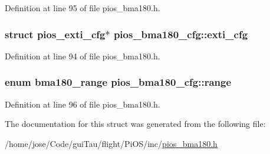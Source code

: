 Definition at line 95 of file pios\-\_\-bma180.\-h.

\hypertarget{structpios__bma180__cfg_a1fc7acd142e861f02f5f8a5b9364bedf}{
\subsubsection[{exti\-\_\-cfg}]{\setlength{\rightskip}{0pt plus 5cm}struct {\bf pios\-\_\-exti\-\_\-cfg}$\ast$ pios\-\_\-bma180\-\_\-cfg\-::exti\-\_\-cfg}}\label{structpios__bma180__cfg_a1fc7acd142e861f02f5f8a5b9364bedf}


Definition at line 94 of file pios\-\_\-bma180.\-h.

\hypertarget{structpios__bma180__cfg_ab6de89aba289da9930b188f183765921}{
\subsubsection[{range}]{\setlength{\rightskip}{0pt plus 5cm}enum {\bf bma180\-\_\-range} pios\-\_\-bma180\-\_\-cfg\-::range}}\label{structpios__bma180__cfg_ab6de89aba289da9930b188f183765921}


Definition at line 96 of file pios\-\_\-bma180.\-h.



The documentation for this struct was generated from the following file\-:\begin{DoxyCompactItemize}
\item 
/home/jose/\-Code/gui\-Tau/flight/\-Pi\-O\-S/inc/\hyperlink{pios__bma180_8h}{pios\-\_\-bma180.\-h}\end{DoxyCompactItemize}
